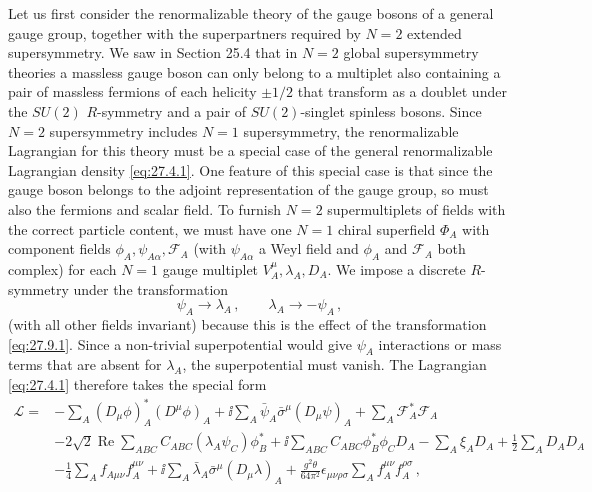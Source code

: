 Let us first consider the renormalizable theory of the gauge bosons of a
general gauge group, together with the superpartners required by \(N=2\)
extended supersymmetry. We saw in Section 25.4 that in \(N=2\) global
supersymmetry theories a massless gauge boson can only belong to a multiplet
also containing a pair of massless fermions of each helicity
\(\mathord{\pm}1/2\) that transform as a doublet under the \(SU(2)\)
\(R\)-symmetry and a pair of \(SU(2)\)-singlet spinless bosons. Since \(N=2\)
supersymmetry includes \(N=1\) supersymmetry, the renormalizable Lagrangian
for this theory must be a special case of the general renormalizable
Lagrangian density \eqref{eq:27.4.1}. One feature of this special case is that
since the gauge boson belongs to the adjoint representation of the gauge
group, so must also the fermions and scalar field. To furnish \(N=2\)
supermultiplets of fields with the correct particle content, we must have one
\(N=1\) chiral superfield \(\Phi_A\) with component fields
\(\phi_A,\psi_{A\alpha},\mathcal{F}_A\) (with \(\psi_{A\alpha}\) a Weyl
field and \(\phi_A\) and \(\mathcal{F}_A\) both complex) for each \(N=1\)
gauge multiplet
\(V_A^\mu,\lambda_A,D_A\). We impose a discrete \(R\)-symmetry under the
transformation
\begin{equation}
  \psi_A\longrightarrow\lambda_A\,,
  \qquad
  \lambda_A\longrightarrow-\psi_A\,,
  \tag{27.9.2}\label{eq:27.9.2}
\end{equation}
(with all other fields invariant) because this is the effect of the
transformation \eqref{eq:27.9.1}. Since a non-trivial superpotential would
give \(\psi_A\) interactions or mass terms that are absent for \(\lambda_A\),
the superpotential must vanish. The Lagrangian \eqref{eq:27.4.1} therefore
takes the special form
\begin{equation}
  \begin{aligned}
  \mathcal{L}={}&
  -\sum_A(D_\mu\phi)_A^*(D^\mu\phi)_A
  +\ii\sum_A\bar\psi_A\bar\sigma^\mu(D_\mu\psi)_A
  +\sum_A\mathcal{F}_A^*\mathcal{F}_A
  \\
  &-2\sqrt{2}\operatorname{Re}\sum_{ABC}
    C_{ABC}\left(\lambda_A\psi_C\right)\phi_B^*
  +\ii\sum_{ABC}C_{ABC}\phi_B^*\phi_CD_A
  -\sum_A\xi_AD_A+\frac12\sum_AD_AD_A
  \\
  &-\frac14\sum_Af_{A\mu\nu}f_A^{\mu\nu}
  +\ii\sum_A\bar\lambda_A\bar\sigma^\mu(D_\mu\lambda)_A
  +\frac{g^2\theta}{64\pi^2}\epsilon_{\mu\nu\rho\sigma}
    \sum_Af_A^{\mu\nu}f_A^{\rho\sigma}\,,
  \end{aligned}
  \tag{27.9.3}\label{eq:27.9.3}
\end{equation}
